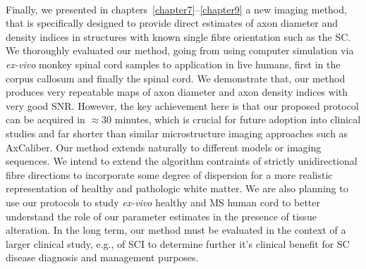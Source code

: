 \paragraph{}
Finally, we presented in chapters~\ref{chapter7}--\ref{chapter9} a new imaging method, that is specifically designed to provide direct estimates of axon diameter and density indices in structures with known single fibre orientation such as the {\gls{SC}}. We thoroughly evaluated our method, going from using computer simulation via \emph{ex-vivo} monkey spinal cord samples to application in live humans, first in the corpus callosum and finally the spinal cord. We demonstrate that‚ our method produces very repeatable maps of axon diameter and axon density indices with very good SNR. However, the key achievement here is that our proposed protocol can be acquired in $\approx$30 minutes, which is crucial for future adoption into clinical studies and far shorter than similar microstructure imaging approaches such as AxCaliber\citep{Assaf:2008}. Our method extends naturally to different models or imaging sequences. We intend to extend the algorithm contraints of strictly unidirectional fibre directions to incorporate some degree of dispersion for a more realistic representation of healthy and pathologic white matter. We are also planning to use our protocols to study \emph{ex-vivo} healthy and MS human cord to better understand the role of our parameter estimates in the presence of tissue alteration. In the long term, our method must be evaluated in the context of a larger clinical study, e.g., of \gls{SCI} to determine further it's clinical benefit for \gls{SC} disease diagnosis and management purposes. 
